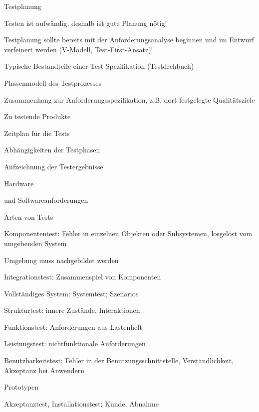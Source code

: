 \documentclass[a4paper]{article}
\begin{document}
\begin{multicols}{3}
  Testplanung
  \begin{itemize*}
    \item Testen ist aufwändig, deshalb ist gute Planung nötig!
    \item Testplanung sollte bereits mit der Anforderungsanalyse beginnen und im Entwurf verfeinert werden (V-Modell, Test-First-Ansatz)!
    \item Typische Bestandteile einer Test-Spezifikation (Testdrehbuch)
          \begin{itemize*}
            \item Phasenmodell des Testprozesses
            \item Zusammenhang zur Anforderungsspezifikation, z.B. dort festgelegte Qualitätsziele
            \item Zu testende Produkte
            \item Zeitplan für die Tests
            \item Abhängigkeiten der Testphasen
            \item Aufzeichnung der Testergebnisse
            \item Hardware\item und Softwareanforderungen
          \end{itemize*}
  \end{itemize*}

  Arten von Tests
  \begin{itemize*}
    \item Komponententest: Fehler in einzelnen Objekten oder Subsystemen, losgelöst vom umgebenden System
          \begin{itemize*}
            \item Umgebung muss nachgebildet werden
          \end{itemize*}
    \item Integrationstest: Zusammenspiel von Komponenten
          \begin{itemize*}
            \item Vollständiges System: Systemtest; Szenarios
          \end{itemize*}
    \item Strukturtest: innere Zustände, Interaktionen
    \item Funktionstest: Anforderungen aus Lastenheft
    \item Leistungstest: nichtfunktionale Anforderungen
    \item Benutzbarkeitstest: Fehler in der Benutzungsschnittstelle, Verständlichkeit, Akzeptanz bei Anwendern
          \begin{itemize*}
            \item Prototypen
          \end{itemize*}
    \item Akzeptanztest, Installationstest: Kunde, Abnahme
  \end{itemize*}


\end{multicols}
\end{document}
